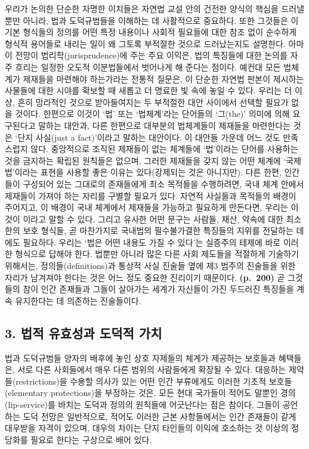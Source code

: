우리가 논의한 단순한 자명한 이치들은 자연법 교설 안의 건전한 양식의
핵심을 드러낼 뿐만 아니라, 법과 도덕규범들을 이해하는 데 사활적으로
중요하다. 또한 그것들은 이 기본 형식들의 정의를 어떤 특정 내용이나
사회적 필요들에 대한 참조 없이 순수하게 형식적 용어들로 내리는 일이 왜
그토록 부적절한 것으로 드러났는지도 설명한다. 아마 이 전망이
법리학(jurisprudence)에 주는 주요 이익은, 법의 특징들에 대한 논의를 자주
흐리는 일정한 오도적 이분법들에서 벗어나게 해 준다는 점이다. 예컨대 모든
법체계가  제재들을 마련해야 하는가라는 전통적 질문은, 이
단순한 자연법 판본이 제시하는 사물들에 대한 시야를 확보할 때 새롭고 더
명료한 빛 속에 놓일 수 있다. 우리는 더 이상, 흔히 망라적인 것으로
받아들여지는 두 부적절한 대안 사이에서 선택할 필요가 없을 것이다.
한편으로 이것이 ‘법’ 또는 ‘법체계’라는 단어들의 ‘그(the)’ 의미에 의해
요구된다고 말하는 대안과, 다른 한편으로 대부분의 법체계들이 제재들을
마련한다는 것은 ‘단지 사실(just a fact)’이라고 말하는 대안이다. 이
대안들 가운데 어느 것도 만족스럽지 않다. 중앙적으로 조직된 제재들이 없는
체계들에 ‘법’이라는 단어를 사용하는 것을 금지하는 확립된 원칙들은
없으며, 그러한 제재들을 갖지 않는 어떤 체계에 ‘국제법’이라는 표현을
사용할 좋은 이유는 있다(강제되는 것은 아니지만). 다른 한편, 인간들이
구성되어 있는 그대로의 존재들에게 최소 목적들을 수행하려면, 국내 체계
안에서 제재들이 가져야 하는 자리를 구별할 필요가 있다. 자연적 사실들과
목적들의 배경이 주어지고, 이 배경이 국내 체계에서 제재들을 가능하고
필요하게 만든다면, 우리는 이것이 이라고 말할 수 있다. 그리고 유사한 어떤 문구는 사람들, 재산,
약속에 대한 최소한의 보호 형식들, 곧 마찬가지로 국내법의 필수불가결한
특징들의 지위를 전달하는 데에도 필요하다. 우리는 ‘법은 어떤 내용도 가질
수 있다’는 실증주의 테제에 바로 이러한 형식으로 답해야 한다. 법뿐만
아니라 많은 다른 사회 제도들을 적절하게 기술하기 위해서는,
정의들(definitions)과 통상적 사실 진술들 옆에 제3 범주의 진술들을 위한
자리가 남겨져야 한다는 것은 어느 정도 중요한 진리이기 때문이다.
\textbf{(p.~200)} 곧 그것들의 참이 인간 존재들과 그들이 살아가는 세계가
자신들이 가진 두드러진 특징들을 계속 유지한다는 데 의존하는 진술들이다.

\subsection{3. 법적 유효성과 도덕적
가치}\label{uxbc95uxc801-uxc720uxd6a8uxc131uxacfc-uxb3c4uxb355uxc801-uxac00uxce58}

법과 도덕규범들 양자의 배후에 놓인 상호 자제들의 체계가 제공하는
보호들과 혜택들은, 서로 다른 사회들에서 매우 다른 범위의 사람들에게
확장될 수 있다. 대응하는 제약들(restrictions)을 수용할 의사가 있는 어떤
인간 부류에게도 이러한 기초적 보호들(elementary protections)을 부정하는
것은, 모든 현대 국가들이 적어도 말뿐인 경의(lip-service)를 바치는 도덕과
정의의 원칙들에 어긋난다는 점은 참이다. 그들이 공언하는 도덕 전망은
일반적으로, 적어도 이러한 근본 사항들에서는 인간 존재들이 같게 대우받을
자격이 있으며, 대우의 차이는 단지 타인들의 이익에 호소하는 것 이상의
정당화를 필요로 한다는 구상으로 배어 있다.

